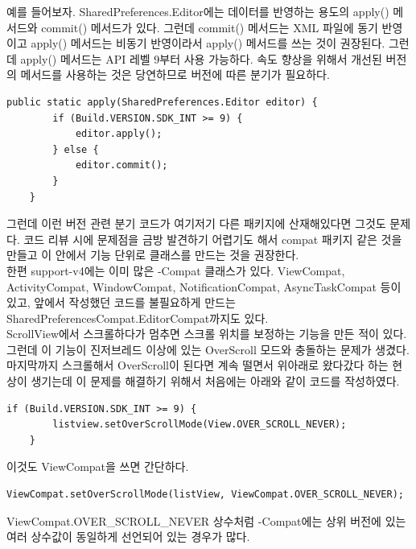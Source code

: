 예를 들어보자. SharedPreferences.Editor에는 데이터를 반영하는 용도의 apply() 메서드와 commit() 메서드가 있다. 
그런데 commit() 메서드는 XML 파일에 동기 반영이고 apply() 메서드는 비동기 반영이라서 apply() 메서드를 쓰는 것이 권장된다. 
그런데 apply() 메서드는 API 레벨 9부터 사용 가능하다. 속도 향상을 위해서 개선된 버전의 메서드를 사용하는 것은 당연하므로 버전에 따른 분기가 필요하다.
\begin{lstlisting}[frame=single]
	public static apply(SharedPreferences.Editor editor) {
		if (Build.VERSION.SDK_INT >= 9) {
   			editor.apply();
   		} else {
   			editor.commit();
   		}
	}
\end{lstlisting}

그런데 이런 버전 관련 분기 코드가 여기저기 다른 패키지에 산재해있다면 그것도 문제다. 
코드 리뷰 시에 문제점을 금방 발견하기 어렵기도 해서 compat 패키지 같은 것을 만들고 이 안에서 기능 단위로 클래스를 만드는 것을 권장한다.\\

한편 support-v4에는 이미 많은 -Compat 클래스가 있다. ViewCompat, ActivityCompat, WindowCompat, NotificationCompat, AsyncTaskCompat 등이 있고, 앞에서 작성했던 코드를 불필요하게 만드는 SharedPreferencesCompat.EditorCompat까지도 있다.\\

ScrollView에서 스크롤하다가 멈추면 스크롤 위치를 보정하는 기능을 만든 적이 있다. 
그런데 이 기능이 진저브레드 이상에 있는 OverScroll 모드와 충돌하는 문제가 생겼다.
마지막까지 스크롤해서 OverScroll이 된다면 계속 떨면서 위아래로 왔다갔다 하는 현상이 생기는데 이 문제를 해결하기 위해서 처음에는 아래와 같이 코드를 작성하였다.
\begin{lstlisting}[frame=single]
	if (Build.VERSION.SDK_INT >= 9) {
   		listview.setOverScrollMode(View.OVER_SCROLL_NEVER);
	}
\end{lstlisting}
이것도 ViewCompat을 쓰면 간단하다.
\begin{lstlisting}[frame=single]
	ViewCompat.setOverScrollMode(listView, ViewCompat.OVER_SCROLL_NEVER);
\end{lstlisting}
ViewCompat.OVER\_SCROLL\_NEVER 상수처럼 -Compat에는 상위 버전에 있는 여러 상수값이 동일하게 선언되어 있는 경우가 많다.\\

